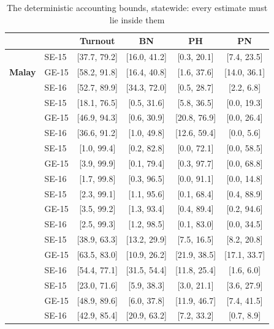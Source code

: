 \begin{table}[!htb]
\caption{The deterministic accounting bounds, statewide: every estimate must lie inside them}
\label{tab:bounds}
\centering
\footnotesize\setlength{\tabcolsep}{5pt}
\begin{tabular}{ll cccc}
\toprule
 & & Turnout & BN & PH & PN \\
\midrule
\multirow{3}{*}{\textbf{Malay}} & SE-15 & [37.7, 79.2] & [16.0, 41.2] & [0.3, 20.1] & [7.4, 23.5] \\
 & GE-15 & [58.2, 91.8] & [16.4, 40.8] & [1.6, 37.6] & [14.0, 36.1] \\
 & SE-16 & [52.7, 89.9] & [34.3, 72.0] & [0.5, 28.7] & [2.2, 6.8] \\
\addlinespace[2pt]
\multirow{3}{*}{\textbf{Chinese}} & SE-15 & [18.1, 76.5] & [0.5, 31.6] & [5.8, 36.5] & [0.0, 19.3] \\
 & GE-15 & [46.9, 94.3] & [0.6, 30.9] & [20.8, 76.9] & [0.0, 26.4] \\
 & SE-16 & [36.6, 91.2] & [1.0, 49.8] & [12.6, 59.4] & [0.0, 5.6] \\
\addlinespace[2pt]
\multirow{3}{*}{\textbf{Indian}} & SE-15 & [1.0, 99.4] & [0.2, 82.8] & [0.0, 72.1] & [0.0, 58.5] \\
 & GE-15 & [3.9, 99.9] & [0.1, 79.4] & [0.3, 97.7] & [0.0, 68.8] \\
 & SE-16 & [1.7, 99.8] & [0.3, 96.5] & [0.0, 91.1] & [0.0, 14.8] \\
\addlinespace[2pt]
\multirow{3}{*}{\textbf{Other}} & SE-15 & [2.3, 99.1] & [1.1, 95.6] & [0.1, 68.4] & [0.4, 88.9] \\
 & GE-15 & [3.5, 99.2] & [1.3, 93.4] & [0.4, 89.4] & [0.2, 94.6] \\
 & SE-16 & [2.5, 99.3] & [1.2, 98.5] & [0.1, 83.0] & [0.0, 34.5] \\
\addlinespace[2pt]
\midrule
\multirow{3}{*}{\textbf{18--29}} & SE-15 & [38.9, 63.3] & [13.2, 29.9] & [7.5, 16.5] & [8.2, 20.8] \\
 & GE-15 & [63.5, 83.0] & [10.9, 26.2] & [21.9, 38.5] & [17.1, 33.7] \\
 & SE-16 & [54.4, 77.1] & [31.5, 54.4] & [11.8, 25.4] & [1.6, 6.0] \\
\addlinespace[2pt]
\multirow{3}{*}{\textbf{30--39}} & SE-15 & [23.0, 71.6] & [5.9, 38.3] & [3.0, 21.1] & [3.6, 27.9] \\
 & GE-15 & [48.9, 89.6] & [6.0, 37.8] & [11.9, 46.7] & [7.4, 41.5] \\
 & SE-16 & [42.9, 85.4] & [20.9, 63.2] & [7.2, 33.2] & [0.7, 8.9] \\

\end{tabular}
\end{table}
